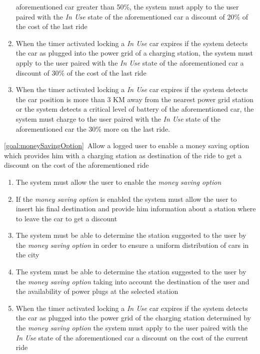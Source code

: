 \begin{description}
\begin{enumerate}[resume*]
  				aforementioned car greater than 50\%, the system must apply to the user paired with
  				the \emph{In Use} state of the aforementioned car a discount of 20\% of the cost
  				of the last ride
  				\item When the timer activated locking a \emph{In Use} car expires if the system
  				detects the car as plugged into the power grid of a charging station, the system must
  				apply to the user paired with the \emph{In Use} state of the aforementioned car a
  				discount of 30\% of the cost of the last ride
  				\item When the timer activated locking a \emph{In Use} car expires if the system
  				detects the car position is more than 3 KM away from the nearest power grid station
  				or the system detects a critical level of battery of the aforementioned car, 
  				the system must charge to the user paired with the \emph{In Use} state of the 
  				aforementioned car the 30\% more on the last ride. 
   			\end{enumerate}
  		\item \ref{goal:moneySavingOption}\ Allow a logged user to enable a money saving option which provides him with a charging station as destination of the ride to get a discount on the cost of the aforementioned ride
  			\begin{enumerate}[resume*]
  				\item The system must allow the user to enable the \emph{money saving option}
  				\item If the  \emph{money saving option} is enabled the system must allow the user
  				to insert his final destination and provide him information about a station where to
  				leave the car to get a discount
  				\item The system must be able to determine the station suggested to the user by the
  				\emph{money saving option} in order to ensure a uniform distribution of cars in the
  				city
  				\item The system must be able to determine the station suggested to the user by the
  				\emph{money saving option} taking into account the destination of the user and
  				the availability of power plugs at the selected station
  				\item When the timer activated locking a \emph{In Use} car expires if the system
  				detects the car as plugged into the power grid of the charging station determined by
  				the \emph{money saving option} the system must apply to the user paired with the
  				\emph{In Use} state of the aforementioned car a discount on the cost of
  				the current ride		
   			\end{enumerate}
  	\end{description}
  	
